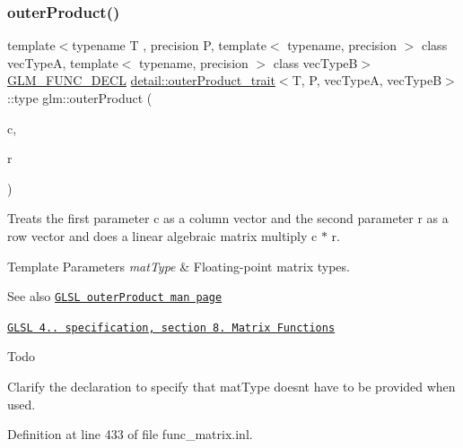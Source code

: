 \subsubsection{\texorpdfstring{outer\+Product()}{outerProduct()}}
{\footnotesize\ttfamily template$<$typename T , precision P, template$<$ typename, precision $>$ class vec\+TypeA, template$<$ typename, precision $>$ class vec\+TypeB$>$ \\
\hyperlink{setup_8hpp_ab2d052de21a70539923e9bcbf6e83a51}{G\+L\+M\+\_\+\+F\+U\+N\+C\+\_\+\+D\+E\+CL} \hyperlink{structglm_1_1detail_1_1outer_product__trait}{detail\+::outer\+Product\+\_\+trait}$<$T, P, vec\+TypeA, vec\+TypeB$>$\+::type glm\+::outer\+Product (\begin{DoxyParamCaption}\item[{vec\+TypeA$<$ T, P $>$ const \&}]{c,  }\item[{vec\+TypeB$<$ T, P $>$ const \&}]{r }\end{DoxyParamCaption})}

Treats the first parameter c as a column vector and the second parameter r as a row vector and does a linear algebraic matrix multiply c $\ast$ r.


\begin{DoxyTemplParams}{Template Parameters}
{\em mat\+Type} & Floating-\/point matrix types.\\
\hline
\end{DoxyTemplParams}
\begin{DoxySeeAlso}{See also}
\href{http://www.opengl.org/sdk/docs/manglsl/xhtml/outerProduct.xml}{\tt G\+L\+SL outer\+Product man page} 

\href{http://www.opengl.org/registry/doc/GLSLangSpec.4.20.8.pdf}{\tt G\+L\+SL 4.. specification, section 8. Matrix Functions}
\end{DoxySeeAlso}
\begin{DoxyRefDesc}{Todo}
\item[\hyperlink{todo__todo000004}{Todo}]Clarify the declaration to specify that mat\+Type doesn\textquotesingle{}t have to be provided when used. \end{DoxyRefDesc}


Definition at line 433 of file func\+\_\+matrix.\+inl.

